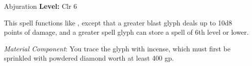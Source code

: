 {Abjuration}
{
	\textbf{Level:}
	Clr 6\\
}
{
	This spell functions like , except that a greater blast glyph deals up to 10d8 points of damage, and a greater spell glyph can store a spell of 6th level or lower.

	\textit{Material Component}:
	You trace the glyph with incense, which must first be sprinkled with powdered diamond worth at least 400 gp.

}
